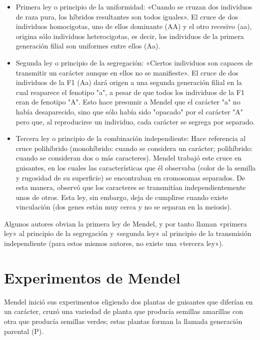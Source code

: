 \documentclass[letterpaper,11pt]{report}
\begin{document}
\begin{itemize}
	\item Primera ley o principio de la uniformidad: «Cuando se cruzan dos individuos de raza pura, los híbridos resultantes son todos iguales». El cruce de dos individuos homocigotas, uno de ellos dominante (AA) y el otro recesivo (aa), origina sólo individuos heterocigotas, es decir, los individuos de la primera generación filial son uniformes entre ellos (Aa).
	
	\item Segunda ley o principio de la segregación: «Ciertos individuos son capaces de transmitir un carácter aunque en ellos no se manifieste». El cruce de dos individuos de la F1 (Aa) dará origen a una segunda generación filial en la cual reaparece el fenotipo "a", a pesar de que todos los individuos de la F1 eran de fenotipo "A". Esto hace presumir a Mendel que el carácter "a" no había desaparecido, sino que sólo había sido "opacado" por el carácter "A" pero que, al reproducirse un individuo, cada carácter se segrega por separado.
	
	\item Tercera ley o principio de la combinación independiente: Hace referencia al cruce polihíbrido (monohíbrido: cuando se considera un carácter; polihíbrido: cuando se consideran dos o más caracteres). Mendel trabajó este cruce en guisantes, en los cuales las características que él observaba (color de la semilla y rugosidad de su superficie) se encontraban en cromosomas separados. De esta manera, observó que los caracteres se transmitían independientemente unos de otros. Esta ley, sin embargo, deja de cumplirse cuando existe vinculación (dos genes están muy cerca y no se separan en la meiosis).
	
\end{itemize}

Algunos autores obvian la primera ley de Mendel, y por tanto llaman «primera ley» al principio de la segregación y «segunda ley» al principio de la transmisión independiente (para estos mismos autores, no existe una «tercera ley»).


\chapter{Experimentos de Mendel}

Mendel inició sus experimentos eligiendo dos plantas de guisantes que diferían en un carácter, cruzó una variedad de planta que producía semillas amarillas con otra que producía semillas verdes; estas plantas forman la llamada generación parental (P).
\end{document}
